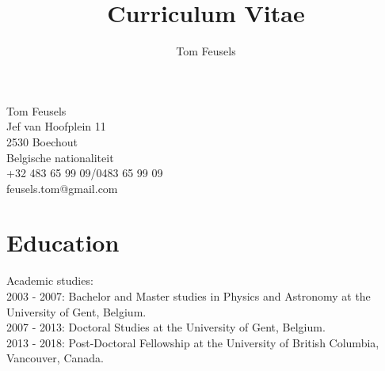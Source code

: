 \documentclass[11pt,a4paper,oneside,fleqn]{article}
\begin{document}
\title{Curriculum Vitae }
\author{Tom Feusels}
\date{}  
\maketitle
Tom Feusels\\
Jef van Hoofplein 11\\
2530 Boechout\\
Belgische nationaliteit\\
+32 483 65 99 09/0483 65 99 09\\
feusels.tom@gmail.com
\section{Education}
Academic studies:\\
2003 - 2007: Bachelor and Master studies in Physics and Astronomy at the University of Gent, Belgium.\\
2007 - 2013: Doctoral Studies at the University of Gent, Belgium.\\
2013 - 2018: Post-Doctoral Fellowship at the University of British Columbia, Vancouver, Canada.
\end{document}
